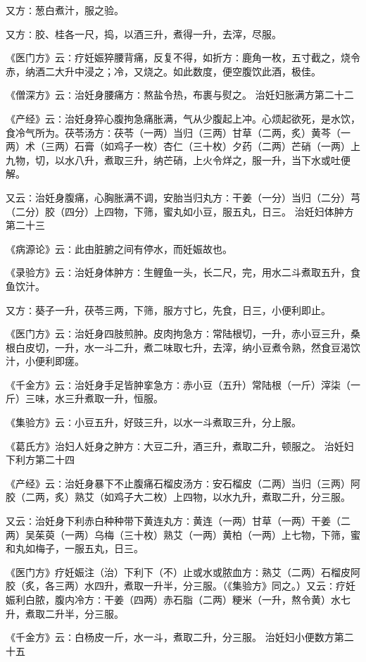 \documentclass[a4paper,12pt,UTF8,twoside]{ctexbook}
\begin{document}
又方∶葱白煮汁，服之验。

又方∶胶、桂各一尺，捣，以酒三升，煮得一升，去滓，尽服。

《医门方》云∶疗妊娠猝腰背痛，反复不得，如折方∶鹿角一枚，五寸截之，烧令赤，纳酒二大升中浸之；冷，又烧之。如此数度，便空腹饮此酒，极佳。

《僧深方》云∶治妊身腰痛方∶熬盐令热，布裹与熨之。
治妊妇胀满方第二十二

《产经》云∶治妊身猝心腹拘急痛胀满，气从少腹起上冲。心烦起欲死，是水饮，食冷气所为。茯苓汤方∶茯苓（一两）当归（三两）甘草（二两，炙）黄芩（一两）术（三两）石膏（如鸡子一枚）杏仁（三十枚）夕药（二两）芒硝（一两）上九物，切，以水八升，煮取三升，纳芒硝，上火令烊之，服一升，当下水或吐便解。

又云∶治妊身腹痛，心胸胀满不调，安胎当归丸方∶干姜（一分）当归（二分）芎（二分）胶（四分）上四物，下筛，蜜丸如小豆，服五丸，日三。
治妊妇体肿方第二十三

《病源论》云∶此由脏腑之间有停水，而妊娠故也。

《录验方》云∶治妊身体肿方∶生鲤鱼一头，长二尺，完，用水二斗煮取五升，食鱼饮汁。

又方∶葵子一升，茯苓三两，下筛，服方寸匕，先食，日三，小便利即止。

《医门方》云∶治妊身四肢煎肿。皮肉拘急方∶常陆根切，一升，赤小豆三升，桑根白皮切，一升，水一斗二升，煮二味取七升，去滓，纳小豆煮令熟，然食豆渴饮汁，小便利即瘥。

《千金方》云∶治妊身手足皆肿挛急方∶赤小豆（五升）常陆根（一斤）滓柒（一斤）三味，水三升煮取一升，恒服。

《集验方》云∶小豆五升，好豉三升，以水一斗煮取三升，分上服。

《葛氏方》治妇人妊身之肿方∶大豆二升，酒三升，煮取二升，顿服之。
治妊妇下利方第二十四

《产经》云∶治妊身暴下不止腹痛石榴皮汤方∶安石榴皮（二两）当归（三两）阿胶（二两，炙）熟艾（如鸡子大二枚）上四物，以水九升，煮取二升，分三服。

又云∶治妊身下利赤白种种带下黄连丸方∶黄连（一两）甘草（一两）干姜（二两）吴茱萸（一两）乌梅（三十枚）熟艾（一两）黄柏（一两）上七物，下筛，蜜和丸如梅子，一服五丸，日三。

《医门方》疗妊娠注（治）下利下（不）止或水或脓血方∶熟艾（二两）石榴皮阿胶（炙，各三两）水四升，煮取一升半，分三服。（《集验方》同之。）又云∶疗妊娠利白脓，腹内冷方∶干姜（四两）赤石脂（二两）粳米（一升，熬令黄）水七升，煮取二升半，分三服。

《千金方》云∶白杨皮一斤，水一斗，煮取二升，分三服。
治妊妇小便数方第二十五
\end{document}
